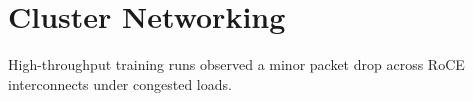 \section{Cluster Networking}
High-throughput training runs observed a minor packet drop across RoCE interconnects under congested loads.

